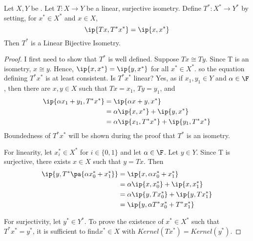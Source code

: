 \begin{prop}
    \label{prop:dualspacepushing}
    Let $X,Y$ be \SeminormedSpaces.
    Let $T:X \to Y$ be a
    linear, 
    surjective
    isometry. 
    Define $T^*:X^* \to Y^*$ by 
    setting, for $x^* \in X^*$ and
    $x \in X$, 
    \begin{equation}
    \ip{Tx, T^*x^*} = \ip{x,x^*}
    \end{equation}
    Then $T^*$ is a Linear Bijective Isometry. 
    \begin{proof} 
        I first need to show that $T^*$ is well defined.
        Suppose $Tx \cong Ty$. 
        Since T is an isometry, $x \cong y$. 
        Hence, $\ip{x,x^*} = \ip{y,x^*}$ for all 
        $x^* \in X^*$. so the equation 
        defining $T^*x^*$ is at least consistent. 
        Is $T^*x^*$ linear? Yes, as 
        if $x_1,y_1 \in Y$ and $\alpha \in \F$, 
        then there are $x,y \in X$ such that 
        $Tx=x_1$, $Ty=y_1$, and 
        \begin{align*}
            \ip{\alpha x_1+y_1, T^*x^*} & = \ip{\alpha x+y, x^*}\\
            & = \alpha \ip{x,x^*}+\ip{y,x^*}\\
            & = \alpha \ip{x_1, T^*x^*}+ \ip{y_1, T^*x^*}
        \end{align*}
        Boundedness of $T^*x^*$ will be shown during the 
        proof that $T^*$ is an isometry. 



    For linearity, let $x_i^* \in X^*$ for 
    $i \in \{0,1\}$ and let $\alpha \in \F$. 
    Let $y \in Y$. 
    Since T is surjective, there exists $x \in X$ 
    such that $y=Tx$.
    Then
    \begin{align*}
        \ip{y, T^*\pa{\alpha x_0^*+x_1^*}} & = \ip{x, \alpha x_0^*+x_1^*} \\
        & = \alpha \ip{x, x_0^*} + \ip{x, x_1^*} \\
        & = \alpha \ip{y, Tx_0^*}+ \ip{y, Tx_1^*}\\
        & = \ip{y, \alpha T^* x_0^* + T^* x_1^*}
    \end{align*}

    For surjectivity, let $y^* \in Y^*$. 
    To prove the existence of $x^* \in X^*$ 
    such that $T^*x^* = y^*$, 
    it is sufficient to find$ x^*\in X$
    with $Kernel(T x^*)=Kernel(y^*)$. 



\end{proof}
\end{prop}
